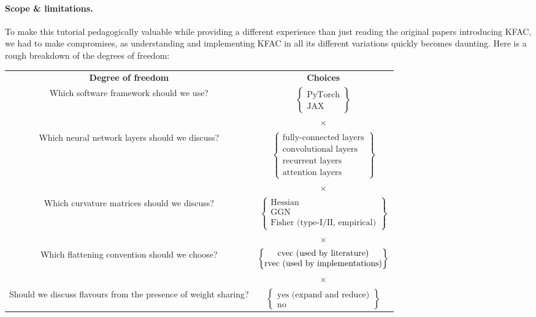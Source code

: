 \paragraph{Scope \& limitations.} To make this tutorial pedagogically valuable while providing a different experience than just reading the original papers introducing KFAC, we had to make compromises, as understanding and implementing KFAC in all its different variations quickly becomes daunting.
Here is a rough breakdown of the degrees of freedom:
\begin{center}

  \begin{tabular}[!h]{cc}
    \textbf{Degree of freedom}
    &
      \textbf{Choices}
    \\
    Which software framework should we use?
    &
      $
      \begin{Bmatrix}
        \text{PyTorch}
        \\
        \text{JAX}
      \end{Bmatrix}
      $
    \\
    & $\times$
    \\
    Which neural network layers should we discuss?
    &
      $
      \begin{Bmatrix}
        \text{fully-connected layers}
        \\
        \text{convolutional layers}
        \\
        \text{recurrent layers}
        \\
        \text{attention layers}
      \end{Bmatrix}
      $
    \\
    & $\times$
    \\
    Which curvature matrices should we discuss?
    &
      $
      \begin{Bmatrix}
        \text{Hessian}
        \\
        \text{GGN}
        \\
        \text{Fisher (type-I/II, empirical)}
      \end{Bmatrix}
      $
    \\
    & $\times$
    \\
    Which flattening convention should we choose?
    &
      $
      \begin{Bmatrix}
        \operatorname{cvec}\,\text{(used by literature)}
        \\
        \operatorname{rvec}\,\text{(used by implementations)}
      \end{Bmatrix}
      $
    \\
    & $\times$
    \\
    Should we discuss flavours from the presence of weight sharing?
    &
      $
      \begin{Bmatrix}
        \text{yes (expand and reduce)}
        \\
        \text{no}
      \end{Bmatrix}
      $
  \end{tabular}
\end{center}
